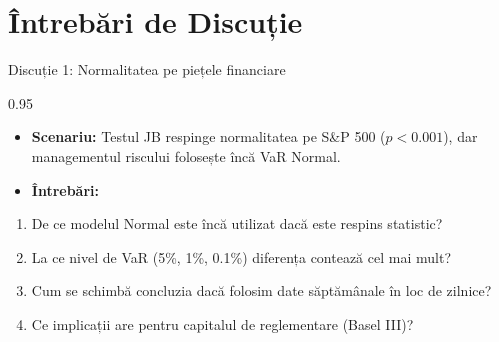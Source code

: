 \documentclass[9pt, aspectratio=169, t]{beamer}
\begin{document}
\section{Întrebări de Discuție}

\begin{frame}{Discuție 1: Normalitatea pe piețele financiare}
\begin{cminipage}{0.95\textwidth}
    \begin{itemize}\setlength{\itemsep}{0pt}
        \item \textbf{Scenariu:} Testul JB respinge normalitatea pe S\&P 500 ($p < 0.001$), dar managementul riscului folosește încă VaR Normal.
        \item \textbf{Întrebări:}
    \end{itemize}
    \begin{enumerate}\setlength{\itemsep}{0pt}
        \item De ce modelul Normal este încă utilizat dacă este respins statistic?
        \item La ce nivel de VaR (5\%, 1\%, 0.1\%) diferența contează cel mai mult?
        \item Cum se schimbă concluzia dacă folosim date săptămânale în loc de zilnice?
        \item Ce implicații are pentru capitalul de reglementare (Basel III)?
    \end{enumerate}
\end{cminipage}
\end{frame}
\end{document}
